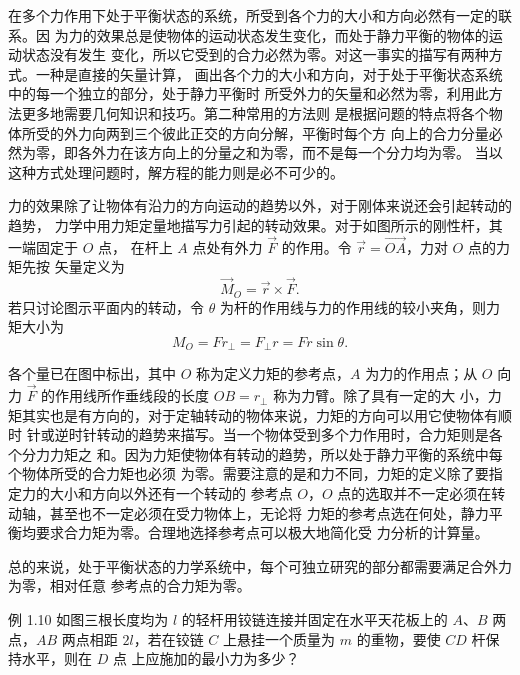 在多个力作用下处于平衡状态的系统，所受到各个力的大小和方向必然有一定的联系。因
为力的效果总是使物体的运动状态发生变化，而处于静力平衡的物体的运动状态没有发生
变化，所以它受到的合力必然为零。对这一事实的描写有两种方式。一种是直接的矢量计算，
画出各个力的大小和方向，对于处于平衡状态系统中的每一个独立的部分，处于静力平衡时
所受外力的矢量和必然为零，利用此方法更多地需要几何知识和技巧。第二种常用的方法则
是根据问题的特点将各个物体所受的外力向两到三个彼此正交的方向分解，平衡时每个方
向上的合力分量必然为零，即各外力在该方向上的分量之和为零，而不是每一个分力均为零。
当以这种方式处理问题时，解方程的能力则是必不可少的。


力的效果除了让物体有沿力的方向运动的趋势以外，对于刚体来说还会引起转动的趋势，
力学中用力矩定量地描写力引起的转动效果。对于如图所示的刚性杆，其一端固定于 $O$ 点，
在杆上 $A$ 点处有外力 $\vec F$ 的作用。令 $\vec r=\overrightarrow{OA}$，力对 $O$ 点的力矩先按
矢量定义为
\begin{equation}
  \vec M_O=\vec r\times\vec F.
\end{equation}
若只讨论图示平面内的转动，令 $\theta$ 为杆的作用线与力的作用线的较小夹角，则力矩大小为
\begin{equation}
  M_O=Fr_{\perp}=F_{\perp}r=Fr\sin\theta.
\end{equation}

各个量已在图中标出，其中 $O$ 称为定义力矩的参考点，$A$ 为力的作用点；从 $O$ 向力
$\vec F$ 的作用线所作垂线段的长度 $OB=r_\perp$ 称为力臂。除了具有一定的大
小，力矩其实也是有方向的，对于定轴转动的物体来说，力矩的方向可以用它使物体有顺时
针或逆时针转动的趋势来描写。当一个物体受到多个力作用时，合力矩则是各个分力力矩之
和。因为力矩使物体有转动的趋势，所以处于静力平衡的系统中每个物体所受的合力矩也必须
为零。需要注意的是和力不同，力矩的定义除了要指定力的大小和方向以外还有一个转动的
参考点 $O$，$O$ 点的选取并不一定必须在转动轴，甚至也不一定必须在受力物体上，无论将
力矩的参考点选在何处，静力平衡均要求合力矩为零。合理地选择参考点可以极大地简化受
力分析的计算量。

总的来说，处于平衡状态的力学系统中，每个可独立研究的部分都需要满足合外力为零，相对任意
参考点的合力矩为零。

\begin{origexamplebox}{例 1.10}
如图三根长度均为 $l$ 的轻杆用铰链连接并固定在水平天花板上的 $A$、$B$ 两点，$AB$
两点相距 $2l$，若在铰链 $C$ 上悬挂一个质量为 $m$ 的重物，要使 $CD$ 杆保持水平，则在 $D$ 点
上应施加的最小力为多少？
\sourcefigurefixB
\end{origexamplebox}


